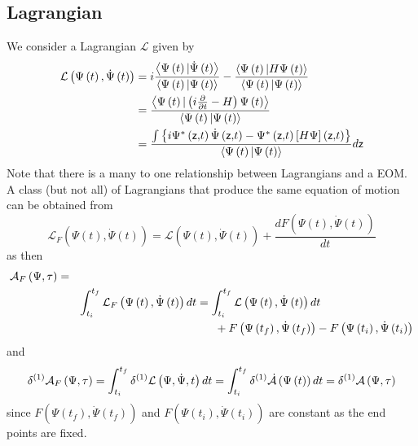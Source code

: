 \documentclass[aps,preprint]{revtex4}
\begin{document}
\subsection{Lagrangian}

We consider a Lagrangian $\mathcal{L}$ given by 
\begin{align}
\mathcal{L}\left( \Psi\left( t\right) ,\dot{\Psi}\left( t\right) \right) & =i%
\frac{\left\langle \Psi\left( t\right) |\dot{\Psi}\left( t\right)
\right\rangle }{\left\langle \Psi\left( t\right) |\Psi\left( t\right)
\right\rangle }-\frac{\left\langle \Psi\left( t\right) |H\Psi\left( t\right)
\right\rangle }{\left\langle \Psi\left( t\right) |\Psi\left( t\right)
\right\rangle }  \notag \\
& =\frac{\left\langle \Psi\left( t\right) |\left( i\frac{\partial}{\partial t%
}-H\right) \Psi\left( t\right) \right\rangle }{\left\langle \Psi\left(
t\right) |\Psi\left( t\right) \right\rangle }  \notag \\
& =\frac{\int\left\{ i\Psi^{\ast}\left( \mathsf{z,}t\right) \dot{\Psi }%
\left( \mathsf{z,}t\right) -\Psi^{\ast}\left( \mathsf{z,}t\right) \left[
H\Psi\right] \left( \mathsf{z,}t\right) \right\} }{\left\langle \Psi\left(
t\right) |\Psi\left( t\right) \right\rangle }d\mathsf{z}  \label{Lar}
\end{align}
Note that there is a many to one relationship between Lagrangians and a EOM.
A class (but not all) of Lagrangians that produce the same equation of
motion can be obtained from 
\begin{equation}
\mathcal{L}_{F}\left( \Psi\left( t\right) ,\dot{\Psi}\left( t\right) \right)
=\mathcal{L}\left( \Psi\left( t\right) ,\dot{\Psi}\left( t\right) \right) +%
\frac{dF\left( \Psi\left( t\right) ,\dot{\Psi}\left( t\right) \right) }{dt}
\label{LF}
\end{equation}
as then 
\begin{align}
& \mathcal{A}_{F}\left( \Psi,\tau\right) =  \notag \\
& \qquad\qquad\qquad\int_{t_{i}}^{t_{f}}\mathcal{L}_{F}\left( \Psi\left(
t\right) ,\dot{\Psi}\left( t\right) \right) dt=\int_{t_{i}}^{t_{f}}\mathcal{L%
}\left( \Psi\left( t\right) ,\dot{\Psi}\left( t\right) \right) dt  \notag \\
& \qquad\qquad\qquad\qquad\qquad\qquad\qquad\qquad\qquad+F\left( \Psi\left(
t_{f}\right) ,\dot{\Psi}\left( t_{f}\right) \right) -F\left( \Psi\left(
t_{i}\right) ,\dot{\Psi}\left( t_{i}\right) \right)
\end{align}
and 
\begin{equation}
\delta^{\left( 1\right) }\mathcal{A}_{F}\left( \Psi,\tau\right)
=\int_{t_{i}}^{t_{f}}\delta^{\left( 1\right) }\mathcal{L}\left( \Psi ,\dot{%
\Psi},t\right) dt=\int_{t_{i}}^{t_{f}}\delta^{\left( 1\right) }\mathcal{\dot{%
A}}\left( \Psi\left( t\right) \right) dt=\delta^{\left( 1\right) }\mathcal{A}%
\left( \Psi,\tau\right)
\end{equation}
since $F\left( \Psi\left( t_{f}\right) ,\dot{\Psi}\left( t_{f}\right)
\right) $ and $F\left( \Psi\left( t_{i}\right) ,\dot{\Psi}\left(
t_{i}\right) \right) $ are constant as the end points are fixed.
\end{document}
